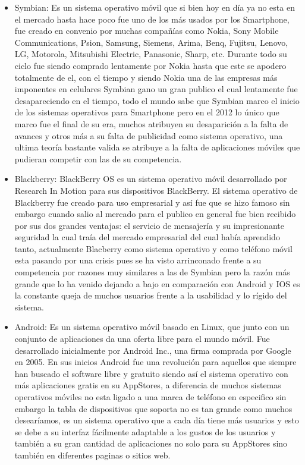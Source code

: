 \documentclass[11pt]{book}
\begin{document}
\begin{itemize}
\item Symbian: Es un sistema operativo móvil que si bien hoy en día ya no esta en el mercado hasta hace poco fue uno de los más usados por los \gls{Smartphone}, fue creado en convenio por muchas compañías como Nokia, Sony Mobile Communications, Psion, Samsung, Siemens, Arima, Benq, Fujitsu, Lenovo, LG, Motorola, Mitsubishi Electric, Panasonic, Sharp, etc. Durante todo su ciclo fue siendo comprado lentamente por Nokia hasta que este se apodero totalmente de el, con el tiempo y siendo Nokia una de las empresas más imponentes en celulares Symbian gano un gran publico el cual lentamente fue desapareciendo en el tiempo, todo el mundo sabe que Symbian marco el inicio de los sistemas operativos para \gls{Smartphone} pero en el 2012 lo único que marco fue el final de su era, muchos atribuyen su desaparición a la falta de avances y otros más a su falta de publicidad como sistema operativo, una ultima teoría bastante valida se atribuye a la falta de aplicaciones móviles que pudieran competir con las de su competencia.

\item Blackberry: BlackBerry OS es un sistema operativo móvil desarrollado por Research In Motion para sus dispositivos BlackBerry. El sistema operativo de Blackberry fue creado para uso empresarial y así fue que se hizo famoso sin embargo cuando salio al mercado para el publico en general fue bien recibido por sus dos grandes ventajas: el servicio de mensajería y su impresionante seguridad la cual traía del mercado empresarial del cual había aprendido tanto, actualmente Blacberry como sistema operativo y como teléfono móvil esta pasando por una crisis pues se ha visto arrinconado frente a su competencia por razones muy similares a las de Symbian pero la razón más grande que lo ha venido dejando a bajo en comparación con Android y IOS es la constante queja de muchos usuarios frente a la usabilidad y lo rígido del sistema.

\item Android: Es un sistema operativo móvil basado en Linux, que junto con un conjunto de aplicaciones da una oferta libre para el mundo móvil. Fue desarrollado inicialmente por Android Inc., una firma comprada por Google en 2005. En sus inicios Android fue una revolución para aquellos que siempre han buscado el software libre y gratuito siendo así el sistema operativo con más aplicaciones gratis en su \gls{AppStores}, a diferencia de muchos sistemas operativos móviles no esta ligado a una marca de teléfono en especifico sin embargo la tabla de dispositivos que soporta no es tan grande como muchos desearíamos, es un sistema operativo que a cada día tiene más usuarios y esto se debe a su interfaz fácilmente adaptable a los gustos de los usuarios y también a su gran cantidad de aplicaciones no solo para su \gls{AppStores} sino también en diferentes paginas o sitios web.


\end{itemize}
\end{document}
